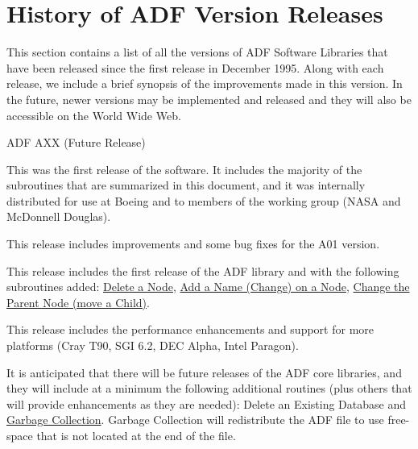\section{History of ADF Version Releases}
\label{s:history}
\thispagestyle{plain}

This section contains a list of all the versions of ADF Software
Libraries that have been released since the first release in December
1995.
Along with each release, we include a brief synopsis of the improvements
made in this version.
In the future, newer versions may be implemented and released and they
will also be accessible on the World Wide Web.

\begin{Ventryi}{ADF AXX (Future Release)}
\item [ADF A01 (December 1995)]
      This was the first release of the software.
      It includes the majority of the subroutines that are summarized
      in this document, and it was internally distributed for use at
      Boeing and to members of the working group (NASA and McDonnell
      Douglas).
\item [ADF A02, A03 (July 1996)]
      This release includes improvements and some bug fixes for the A01
      version.
\item [ADF B01 (September 1996)]
      This release includes the first release of the ADF library and
      with the following subroutines added:
      \hyperlink{sub:Delete}{Delete a Node},
      \hyperlink{sub:Put_Name}{Add a Name (Change) on a Node},
      \hyperlink{sub:Move_Child}{Change the Parent Node (move a Child)}.
\item [ADF C00 (October 1996)]
      This release includes the performance enhancements and support
      for more platforms (Cray T90, SGI 6.2, DEC Alpha, Intel Paragon).
\item [ADF AXX (Future Release)]
      It is anticipated that there will be future releases of the ADF
      core libraries, and they will include at a minimum the following
      additional routines (plus others that will provide enhancements
      as they are needed):
      Delete an Existing Database and
      \hyperlink{sub:Database_Garbage_Collection}{Garbage Collection}.
      Garbage Collection will redistribute the ADF file to use
      free-space that is not located at the end of the file.
\end{Ventryi}

